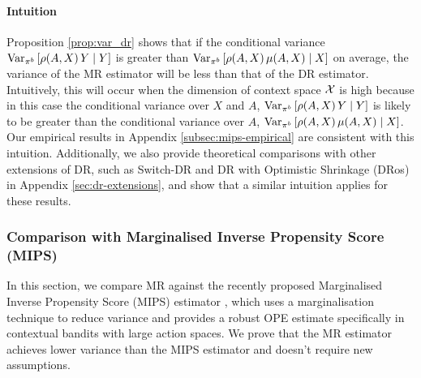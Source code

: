 \paragraph{Intuition}
Proposition \ref{prop:var_dr} shows that if the conditional variance $\textup{Var}_{\pi^b}\left[ \rho(A, X)\,Y \mid Y \right]$ is greater than $\textup{Var}_{\pi^b}\left[ \rho(A, X)\,\mu(A, X) \mid X \right]$ on average, the variance of the MR estimator will be less than that of the DR estimator. 
Intuitively, this will occur when the dimension of context space $\mathcal{X}$ is high because in this case the conditional variance over $X$ and $A$, $\textup{Var}_{\pi^b}\left[\rho(A, X)\,Y \mid Y \right]$ is likely to be greater than the conditional variance over $A$, $\textup{Var}_{\pi^b}\left[ \rho(A, X)\,\mu(A, X) \mid X \right]$. Our empirical results in Appendix \ref{subsec:mips-empirical} are consistent with this intuition.
Additionally, we also provide theoretical comparisons with other extensions of DR, such as Switch-DR \citep{wang2017optimal} and DR with Optimistic Shrinkage (DRos) \citep{su2020doubly} in Appendix \ref{sec:dr-extensions}, and show that a similar intuition applies for these results. 

\subsubsection{Comparison with Marginalised Inverse Propensity Score (MIPS) \citep{saito2022off}}\label{subsec:mips-comparison}
In this section, we compare MR against the recently proposed Marginalised Inverse Propensity Score (MIPS) estimator \citep{saito2022off}, which uses a marginalisation technique to reduce variance and provides a robust OPE estimate specifically in contextual bandits with large action spaces. We prove that the MR estimator achieves lower variance than the MIPS estimator and doesn't require new assumptions.


